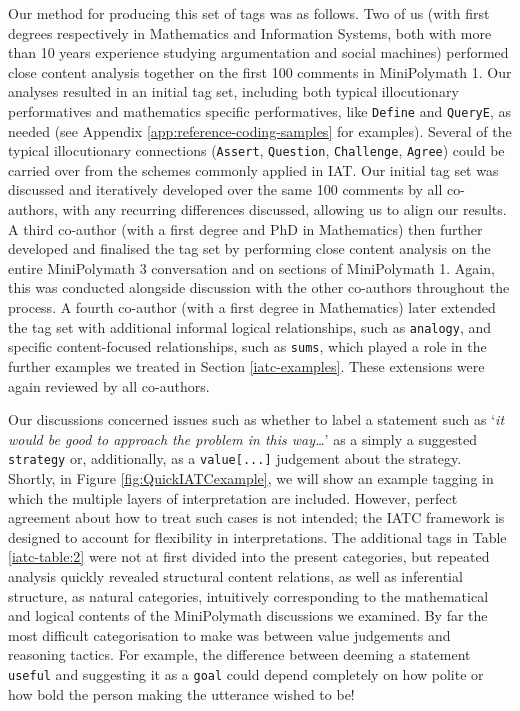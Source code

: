 \documentclass[smallextended,oneside]{svjour3}       %
\let\cite\citep
\newcommand\nothing[1]{#1}
\let\paragraph\nothing
\begin{document}
\paragraph{Our method for producing this set of tags was as follows.}
Two of us (with first degrees respectively in Mathematics and Information
Systems, both with more than 10 years experience studying
argumentation and social machines) performed close content analysis
\cite{klaus2004content} together on the first 100 comments in MiniPolymath
1.  Our analyses resulted in an initial tag set, including both typical
illocutionary performatives and mathematics specific performatives,
like \texttt{Define} and \texttt{QueryE}, as
needed (see Appendix \ref{app:reference-coding-samples} for examples).  Several
of the typical illocutionary connections (\texttt{Assert}, \texttt{Question}, \texttt{Challenge},
\texttt{Agree}) could be carried over from the schemes commonly applied in
IAT.  Our initial tag set was discussed and iteratively developed over
the same 100 comments by all co-authors, with any recurring
differences discussed, allowing us to align our results.  A third
co-author (with a first degree and PhD in Mathematics) then further
developed and finalised the tag set by performing close content
analysis on the entire MiniPolymath 3 conversation and on sections of
MiniPolymath 1.  Again, this was conducted alongside discussion with
the other co-authors throughout the process.
A fourth co-author  (with a first degree in Mathematics)
later extended the tag set
with
additional informal logical relationships, such as \texttt{analogy}, and specific
content-focused relationships, such as \texttt{sums}, which played a
role in the further examples we treated in Section
\ref{iatc-examples}.  These extensions were again reviewed by all co-authors.

Our discussions concerned issues such as whether to label a statement such as
`\emph{it would be good to approach the problem in this way\ldots}'
as a simply a suggested \texttt{strategy} or, additionally, as a \texttt{value[...]} judgement
about the strategy.  Shortly, in Figure \ref{fig:QuickIATCexample}, we will
show an example tagging in which the multiple layers of interpretation are included.
However, perfect agreement about how to treat such
cases is not intended; the IATC framework is designed to account for
flexibility in interpretations.
The additional tags in Table \ref{iatc-table:2} were not at first
divided into the present categories, but repeated analysis quickly
revealed structural content relations, as well as inferential
structure, as natural categories, intuitively corresponding to the
mathematical and logical contents of the MiniPolymath discussions we examined.  By
far the most difficult categorisation to make was between value
judgements and reasoning tactics.  For example, the difference between
deeming a statement \texttt{useful} and suggesting it as a
\texttt{goal} could depend completely on how polite or how bold the
person making the utterance wished to be!
\end{document}
